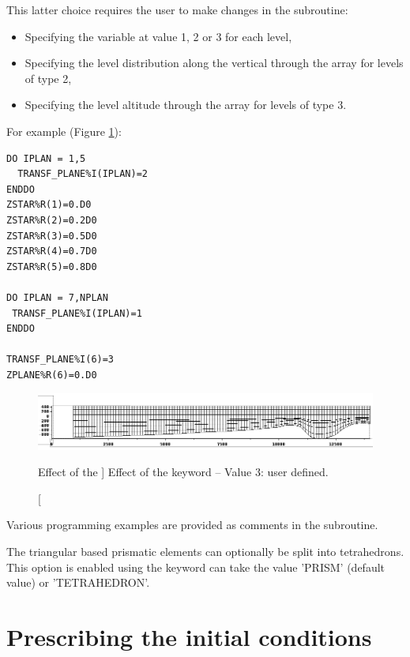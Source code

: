 This latter choice requires the user to make changes in the
 subroutine:

\begin{itemize}
\item Specifying the variable  at value 1, 2 or 3
for each level,

\item Specifying the level distribution along the vertical through the array
 for levels of type 2,

\item Specifying the level altitude through the array  
for levels of type 3.
\end{itemize}

For example (Figure \ref{fig:mesh_transf3}):
\begin{lstlisting}[language=TelFortran]
DO IPLAN = 1,5
  TRANSF_PLANE%I(IPLAN)=2
ENDDO
ZSTAR%R(1)=0.D0
ZSTAR%R(2)=0.2D0
ZSTAR%R(3)=0.5D0
ZSTAR%R(4)=0.7D0
ZSTAR%R(5)=0.8D0

DO IPLAN = 7,NPLAN
 TRANSF_PLANE%I(IPLAN)=1
ENDDO

TRANSF_PLANE%I(6)=3
ZPLANE%R(6)=0.D0
\end{lstlisting}

\begin{figure}[H]%
\begin{center}
%
  \includegraphics[width=\textwidth]{./graphics/mesh_transformation3}
%
\end{center}
\caption
[Effect of the ]
{Effect of the  keyword -- Value 3: user defined.}
\label{fig:mesh_transf3}
\end{figure}

Various programming examples are provided as comments in the
 subroutine.

The triangular based prismatic elements can optionally be split into
tetrahedrons. This option is enabled using the  keyword can
take the value 'PRISM' (default value) or 'TETRAHEDRON'.


\section{Prescribing the initial conditions}

